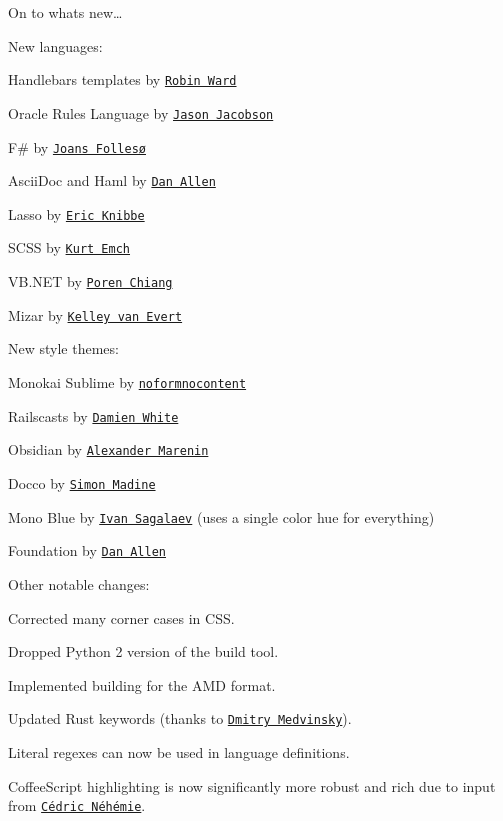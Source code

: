 On to what\textquotesingle{}s new…

New languages\+:


\begin{DoxyItemize}
\item Handlebars templates by \href{https://github.com/eviltrout}{\tt Robin Ward}
\item Oracle Rules Language by \href{https://github.com/jayce7}{\tt Jason Jacobson}
\item F\# by \href{https://github.com/follesoe}{\tt Joans Follesø}
\item Ascii\+Doc and Haml by \href{https://github.com/mojavelinux}{\tt Dan Allen}
\item Lasso by \href{https://github.com/EricFromCanada}{\tt Eric Knibbe}
\item S\+C\+SS by \href{https://github.com/kemch}{\tt Kurt Emch}
\item V\+B.\+N\+ET by \href{https://github.com/rschiang}{\tt Poren Chiang}
\item Mizar by \href{https://github.com/kelleyvanevert}{\tt Kelley van Evert}
\end{DoxyItemize}

New style themes\+:


\begin{DoxyItemize}
\item Monokai Sublime by \href{http://nn.mit-license.org/}{\tt noformnocontent}
\item Railscasts by \href{https://github.com/visoft}{\tt Damien White}
\item Obsidian by \href{https://github.com/ioncreature}{\tt Alexander Marenin}
\item Docco by \href{https://github.com/thingsinjars}{\tt Simon Madine}
\item Mono Blue by \href{https://github.com/isagalaev}{\tt Ivan Sagalaev} (uses a single color hue for everything)
\item Foundation by \href{https://github.com/mojavelinux}{\tt Dan Allen}
\end{DoxyItemize}

Other notable changes\+:


\begin{DoxyItemize}
\item Corrected many corner cases in C\+SS.
\item Dropped Python 2 version of the build tool.
\item Implemented building for the A\+MD format.
\item Updated Rust keywords (thanks to \href{https://github.com/dmedvinsky}{\tt Dmitry Medvinsky}).
\item Literal regexes can now be used in language definitions.
\item Coffee\+Script highlighting is now significantly more robust and rich due to input from \href{https://github.com/abe33}{\tt Cédric Néhémie}.
\end{DoxyItemize}

